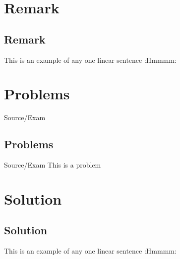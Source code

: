 \documentclass[11pt]{scrartcl} %
\begin{document}
\section{Remark}
\begin{remark}
\lipsum[1]
\end{remark}


\subsection{Remark}
\begin{remark}
This is an example of any one linear sentence :Hmmmm:
\end{remark}
\newpage


\section{Problems}
\begin{problem}{Source/Exam}
\lipsum[1]
\end{problem}


\subsection{Problems}
\begin{problem}{Source/Exam}
This is a problem 
\end{problem}
\newpage

\section{Solution}
\begin{solution}
\lipsum[1]
\end{solution}


\subsection{Solution}
\begin{solution}
This is an example of any one linear sentence :Hmmmm:
\end{solution}
\end{document}
